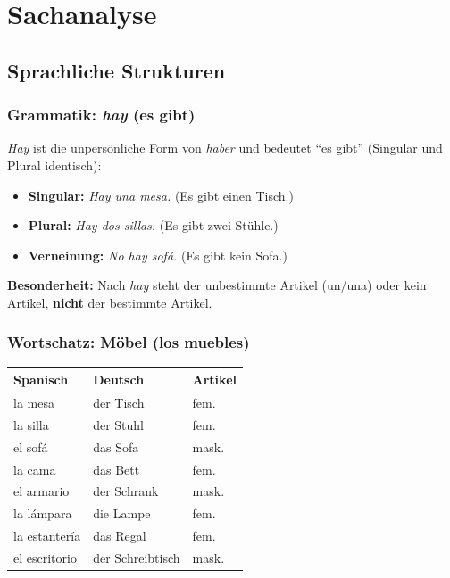 \documentclass[11pt,a4paper]{article}
\begin{document}
\section{Sachanalyse}

\subsection{Sprachliche Strukturen}

\subsubsection{Grammatik: \textit{hay} (es gibt)}

\textit{Hay} ist die unpersönliche Form von \textit{haber} und bedeutet ``es gibt'' (Singular und Plural identisch):

\begin{itemize}
    \item \textbf{Singular:} \textit{Hay una mesa.} (Es gibt einen Tisch.)
    \item \textbf{Plural:} \textit{Hay dos sillas.} (Es gibt zwei Stühle.)
    \item \textbf{Verneinung:} \textit{No hay sofá.} (Es gibt kein Sofa.)
\end{itemize}

\textbf{Besonderheit:} Nach \textit{hay} steht der unbestimmte Artikel (un/una) oder kein Artikel, \textbf{nicht} der bestimmte Artikel.

\subsubsection{Wortschatz: Möbel (los muebles)}

\begin{tabular}{|l|l|l|}
\hline
\textbf{Spanisch} & \textbf{Deutsch} & \textbf{Artikel} \\
\hline
la mesa & der Tisch & fem. \\
\hline
la silla & der Stuhl & fem. \\
\hline
el sofá & das Sofa & mask. \\
\hline
la cama & das Bett & fem. \\
\hline
el armario & der Schrank & mask. \\
\hline
la lámpara & die Lampe & fem. \\
\hline
la estantería & das Regal & fem. \\
\hline
el escritorio & der Schreibtisch & mask. \\
\hline
\end{tabular}
\end{document}
